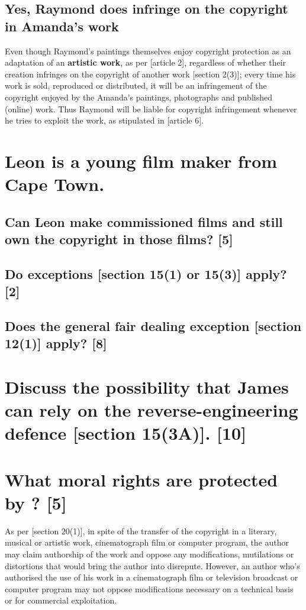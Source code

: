 \documentclass[11pt]{article}
\begin{document}
\subsection{Yes, Raymond does infringe on the copyright in Amanda's work}
\label{sec:orge83fe0f}
Even though Raymond's paintings themselves enjoy copyright protection as
an adaptation of an \textbf{artistic work}, as per [article
2]\cite{wipo86_berne}, regardless of whether their creation infringes on the
copyright of another work [section 2(3)]\cite{rsa78_copyrightact}; every time his work is sold, reproduced or distributed,
it will be an infringement of the copyright enjoyed by the Amanda's paintings,
photographs and published (online) work. Thus Raymond will be liable for
copyright infringement whenever he tries to exploit the work, as stipulated in [article 6]\cite{wto17_trips}.


\section{Leon is a young film maker from Cape Town.}
\label{sec:org8dfa065}

\subsection{Can Leon make commissioned films and still own the copyright in those films? [5]}
\label{sec:org2fa9940}

\subsection{Do exceptions [section 15(1) or 15(3)]\cite{rsa78_copyrightact} apply? [2]}
\label{sec:orgd4c7909}

\subsection{Does the general fair dealing exception [section 12(1)]\cite{rsa78_copyrightact} apply? [8]}
\label{sec:orgd7dc0ef}

\section{Discuss the possibility that James can rely on the reverse-engineering defence [section 15(3A)]\cite{wipo96_copyright_treaty}. [10]}
\label{sec:org3a0e6a7}

\section{What moral rights are protected by ? [5]}
\label{sec:org648c53d}
As per [section 20(1)]\cite{rsa78_copyrightact}, in spite of the transfer of the
copyright in a literary, musical or artistic work, cinematograph film or
computer program, the author may claim authorship of the work and oppose any
modifications, mutilations or distortions that would bring the author into
disrepute. However, an author who's authorised the use of his work in a
cinematograph film or television broadcast or computer program may not oppose
modifications necessary on a technical basis or for commercial exploitation.
\end{document}
